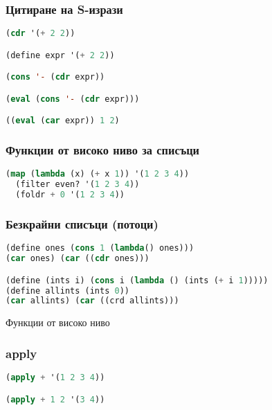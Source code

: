 \documentclass{beamer}
\begin{document}
\begin{frame}[fragile]
\frametitle{Цитиране на S-изрази}

\begin{lstlisting}[language=Lisp]
(cdr '(+ 2 2))

(define expr '(+ 2 2))

(cons '- (cdr expr))

(eval (cons '- (cdr expr)))

((eval (car expr)) 1 2)
\end{lstlisting}

\end{frame}

\begin{frame}[fragile]
\frametitle{Функции от високо ниво за списъци}

\begin{lstlisting}[language=Lisp]
  (map (lambda (x) (+ x 1)) '(1 2 3 4))
  (filter even? '(1 2 3 4))
  (foldr + 0 '(1 2 3 4))
\end{lstlisting}

\end{frame}


\begin{frame}[fragile]
\frametitle{Безкрайни списъци (потоци)}

\begin{lstlisting}[language=Lisp]
(define ones (cons 1 (lambda() ones)))
(car ones) (car ((cdr ones)))

(define (ints i) (cons i (lambda () (ints (+ i 1)))))
(define allints (ints 0))
(car allints) (car ((crd allints)))
\end{lstlisting}

\end{frame}

\begin{frame}
  \centerline{Функции от високо ниво}
\end{frame}

\begin{frame}[fragile]
\frametitle{apply}
\begin{lstlisting}[language=Lisp]
(apply + '(1 2 3 4))

(apply + 1 2 '(3 4))
\end{lstlisting}
\end{frame}
\end{document}
